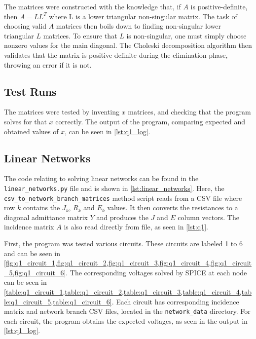 \documentclass[a4paper,titlepage]{article}
\begin{document}
	The matrices were constructed with the knowledge that, if $A$ is positive-definite, then $A = LL^T$ where L is a lower triangular non-singular matrix. The task of choosing valid $A$ matrices then boils down to finding non-singular lower triangular $L$ matrices. To ensure that $L$ is non-singular, one must simply choose nonzero values for the main diagonal. The Choleski decomposition algorithm then validates that the matrix is positive definite during the elimination phase, throwing an error if it is not.
	
	\subsection{Test Runs}
	
	The matrices were tested by inventing $x$ matrices, and checking that the program solves for that $x$ correctly. The output of the program, comparing expected and obtained values of $x$, can be seen in \autoref{lst:q1_log}.
	
	\subsection{Linear Networks}
	
	The code relating to solving linear networks can be found in the \texttt{linear_networks.py} file and is shown in \autoref{lst:linear_networks}. Here, the \texttt{csv_to_network_branch_matrices} method script reads from a CSV file where row $k$ contains the $J_k$, $R_k$ and $E_k$ values. It then converts the resistances to a diagonal admittance matrix $Y$ and produces the $J$ and $E$ column vectors. The incidence matrix $A$ is also read directly from file, as seen in \autoref{lst:q1}.
	
	First, the program was tested various circuits. These circuits are labeled 1 to 6 and can be seen in \cref{fig:q1_circuit_1,fig:q1_circuit_2,fig:q1_circuit_3,fig:q1_circuit_4,fig:q1_circuit_5,fig:q1_circuit_6}. The corresponding voltages solved by SPICE at each node can be seen in \cref{table:q1_circuit_1,table:q1_circuit_2,table:q1_circuit_3,table:q1_circuit_4,table:q1_circuit_5,table:q1_circuit_6}. Each circuit has corresponding incidence matrix and network branch CSV files, located in the \texttt{network_data} directory. For each circuit, the program obtains the expected voltages, as seen in the output in \autoref{lst:q1_log}.
	
\end{document}
